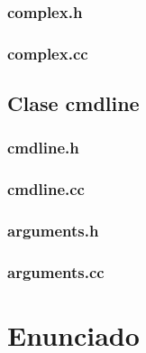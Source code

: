 \documentclass[10pt,a4paper]{article}
\begin{document}
\subsubsection*{complex.h}

\subsubsection*{complex.cc}


\subsection{Clase cmdline}
\subsubsection*{cmdline.h}

\subsubsection*{cmdline.cc}

\subsubsection*{arguments.h}

\subsubsection*{arguments.cc}


\newpage
\section{Enunciado}
\end{document}
